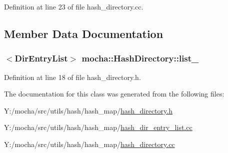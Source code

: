 Definition at line 23 of file hash\_\-directory.cc.



\subsection{Member Data Documentation}
\hypertarget{classmocha_1_1_hash_directory_ae64210a843b2cd26679a0beb226a2ed1}{
\subsubsection[{list\_\-}]{$<${\bf DirEntryList}$>$ {\bf mocha::HashDirectory::list\_\-}}}
\label{classmocha_1_1_hash_directory_ae64210a843b2cd26679a0beb226a2ed1}


Definition at line 18 of file hash\_\-directory.h.



The documentation for this class was generated from the following files:\begin{DoxyCompactItemize}
\item 
Y:/mocha/src/utils/hash/hash\_\-map/\hyperlink{hash__directory_8h}{hash\_\-directory.h}\item 
Y:/mocha/src/utils/hash/hash\_\-map/\hyperlink{hash__dir__entry__list_8cc}{hash\_\-dir\_\-entry\_\-list.cc}\item 
Y:/mocha/src/utils/hash/hash\_\-map/\hyperlink{hash__directory_8cc}{hash\_\-directory.cc}\end{DoxyCompactItemize}
